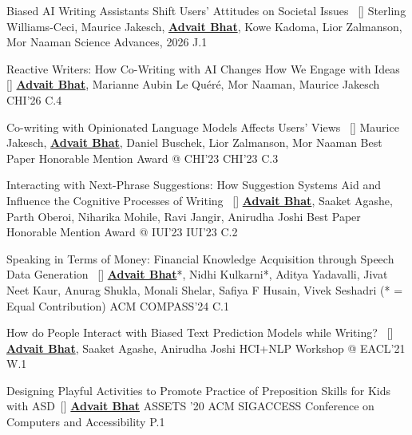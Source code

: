 
\begin{publications}

\vspace{1.5mm}
\publication
    {Biased AI Writing Assistants Shift Users' Attitudes on Societal Issues}{~ [\href{https://www.science.org/doi/10.1126/sciadv.adw5578}{\small{\linkSymbol}}]}
    {Sterling Williams-Ceci, Maurice Jakesch, \underline{\textbf{Advait Bhat}}, Kowe Kadoma, Lior Zalmanson, Mor Naaman}
	{} {Science Advances, 2026} {J.1}

\vspace{1.5mm}
\publication
    {Reactive Writers: How Co-Writing with AI Changes How We Engage with Ideas}{~ [\href{https://arxiv.org/abs/2603.10374}{\small{\linkSymbol}}]}
    {\underline{\textbf{Advait Bhat}}, Marianne Aubin Le Qu\'er\'e, Mor Naaman, Maurice Jakesch}
	{} {CHI'26} {C.4}

\vspace{1.5mm}
\publication
    {Co-writing with Opinionated Language Models Affects Users' Views}{~ [\href{https://dl.acm.org/doi/abs/10.1145/3544548.3581196}{\small{\linkSymbol}}]}
    {Maurice Jakesch, \underline{\textbf{Advait Bhat}}, Daniel Buschek, Lior Zalmanson, Mor Naaman}
	{ Best Paper Honorable Mention Award @ CHI'23} {CHI'23} {C.3}

\vspace{1.5mm}
\publication
    {Interacting with Next-Phrase Suggestions: How Suggestion Systems Aid and Influence the Cognitive Processes of Writing}{~ [\href{https://dl.acm.org/doi/abs/10.1145/3581641.3584060}{\small{\linkSymbol}}]}
    {\underline{\textbf{Advait Bhat}}, Saaket Agashe, Parth Oberoi, Niharika Mohile, Ravi Jangir, Anirudha Joshi}
	{ Best Paper Honorable Mention Award @ IUI'23} {IUI'23} {C.2}

\vspace{1.5mm}
\publication
    {Speaking in Terms of Money: Financial Knowledge Acquisition through Speech Data Generation}{~ [\href{https://dl.acm.org/doi/full/10.1145/3663775}{\small{\linkSymbol}}]}
    {\underline{\textbf{Advait Bhat}}*, Nidhi Kulkarni*, Aditya Yadavalli, Jivat Neet Kaur, Anurag Shukla, Monali Shelar, Safiya F Husain, Vivek Seshadri \small{(* = Equal Contribution)}}
	{} {ACM COMPASS'24} {C.1}

\vspace{1.5mm}
\publication
    {How do People Interact with Biased Text Prediction Models while Writing?}{~ [\href{https://aclanthology.org/2021.hcinlp-1.18/}{\small{\linkSymbol}}]}
    {\underline{\textbf{Advait Bhat}}, Saaket Agashe, Anirudha Joshi}
	{} {HCI+NLP Workshop @ EACL'21} {W.1}

\publication
    {Designing Playful Activities to Promote Practice of Preposition Skills for Kids with ASD}{~[\href{https://dl.acm.org/doi/abs/10.1145/3373625.3418004}{\small{\linkSymbol}}]}
    {\underline{\textbf{Advait Bhat}}}
	{ASSETS '20} {ACM SIGACCESS Conference on Computers and Accessibility} {P.1}

\end{publications}
